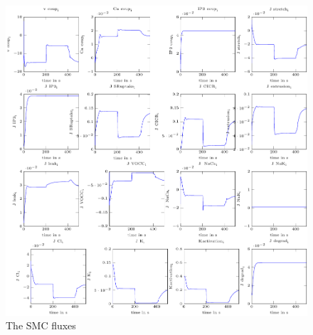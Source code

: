 \begin{landscape}
		\begin{figure}[h!]
			\centering
			\tiny 
			\setlength\figureheight{3 cm} 
			\setlength\figurewidth{4.5 cm}
			\includegraphics{figures/2_SMC_fluxes.pdf}
			\caption{The SMC fluxes}
			\label{fig:2SMCF}
		\end{figure}
		

\end{landscape}
